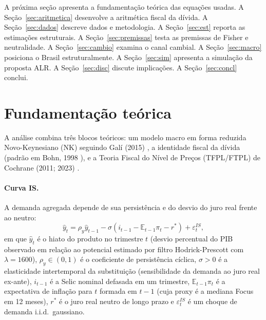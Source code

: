 \documentclass[11pt,a4paper]{article}
\begin{document}
A próxima seção apresenta a fundamentação teórica das equações usadas. A
Seção~\ref{sec:aritmetica} desenvolve a aritmética fiscal da dívida. A
Seção~\ref{sec:dados} descreve dados e metodologia. A Seção~\ref{sec:est}
reporta as estimações estruturais. A Seção~\ref{sec:premissas} testa as
premissas de Fisher e neutralidade. A Seção~\ref{sec:cambio} examina o
canal cambial. A Seção~\ref{sec:macro} posiciona o Brasil estruturalmente.
A Seção~\ref{sec:sim} apresenta a simulação da proposta ALR. A
Seção~\ref{sec:disc} discute implicações. A Seção~\ref{sec:concl}
conclui.

\section{Fundamentação teórica}\label{sec:teoria}

A análise combina três blocos teóricos: um modelo macro em forma reduzida
Novo-Keynesiano (NK) seguindo Galí (2015) \cite{gali2015}, a identidade
fiscal da dívida (padrão em Bohn, 1998 \cite{bohn1998}), e a Teoria Fiscal
do Nível de Preços (TFPL/FTPL) de Cochrane (2011; 2023) \cite{cochrane2011,cochrane2023}.

\paragraph{Curva IS.} A demanda agregada depende de sua persistência e do
desvio do juro real frente ao neutro:
\begin{equation}\label{eq:is}
\hat{y}_t = \rho_y \hat{y}_{t-1} - \sigma \left( i_{t-1} - \mathbb{E}_{t-1}\pi_t - r^* \right) + \varepsilon^{IS}_t,
\end{equation}
em que $\hat{y}_t$ é o hiato do produto no trimestre $t$ (desvio percentual
do PIB observado em relação ao potencial estimado por filtro
Hodrick-Prescott com $\lambda=1600$), $\rho_y \in (0,1)$ é o coeficiente
de persistência cíclica, $\sigma > 0$ é a elasticidade intertemporal da
substituição (sensibilidade da demanda ao juro real ex-ante), $i_{t-1}$
é a Selic nominal defasada em um trimestre, $\mathbb{E}_{t-1}\pi_t$ é a
expectativa de inflação para $t$ formada em $t-1$ (cuja proxy é a
mediana Focus em 12 meses), $r^*$ é o juro real neutro de longo prazo e
$\varepsilon^{IS}_t$ é um choque de demanda i.i.d.\ gaussiano.
\end{document}
